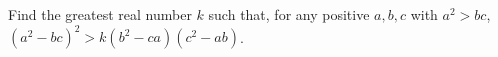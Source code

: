 Find the greatest real number $k$ such that, for any positive $a,b,c$ with $a^{2} > bc$, $(a^{2}-bc)^{2} > k(b^{2}-ca)(c^{2}-ab)$.
